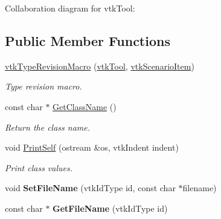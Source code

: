 Collaboration diagram for vtkTool:\subsection*{Public Member Functions}
\begin{DoxyCompactItemize}
\item 
\hypertarget{classvtkTool_afd4b5a15701d73c9ea10dd86960ff180}{
\hyperlink{classvtkTool_afd4b5a15701d73c9ea10dd86960ff180}{vtkTypeRevisionMacro} (\hyperlink{classvtkTool}{vtkTool}, \hyperlink{classvtkScenarioItem}{vtkScenarioItem})}
\label{classvtkTool_afd4b5a15701d73c9ea10dd86960ff180}

\begin{DoxyCompactList}\small\item\em Type revision macro. \item\end{DoxyCompactList}\item 
\hypertarget{classvtkTool_a36e7d337037abb2ba43ec2b5bea26bfc}{
const char $\ast$ \hyperlink{classvtkTool_a36e7d337037abb2ba43ec2b5bea26bfc}{GetClassName} ()}
\label{classvtkTool_a36e7d337037abb2ba43ec2b5bea26bfc}

\begin{DoxyCompactList}\small\item\em Return the class name. \item\end{DoxyCompactList}\item 
\hypertarget{classvtkTool_a9858b0b58f68255aa112301628e9a32d}{
void \hyperlink{classvtkTool_a9858b0b58f68255aa112301628e9a32d}{PrintSelf} (ostream \&os, vtkIndent indent)}
\label{classvtkTool_a9858b0b58f68255aa112301628e9a32d}

\begin{DoxyCompactList}\small\item\em Print class values. \item\end{DoxyCompactList}\item 
\hypertarget{classvtkTool_a47c15af2e5a24c7931621ab49aff0876}{
void {\bfseries SetFileName} (vtkIdType id, const char $\ast$filename)}
\label{classvtkTool_a47c15af2e5a24c7931621ab49aff0876}

\item 
\hypertarget{classvtkTool_a5ed1a313cc4e75648ea2bea6362465ce}{
const char $\ast$ {\bfseries GetFileName} (vtkIdType id)}
\label{classvtkTool_a5ed1a313cc4e75648ea2bea6362465ce}


\end{DoxyCompactItemize}

